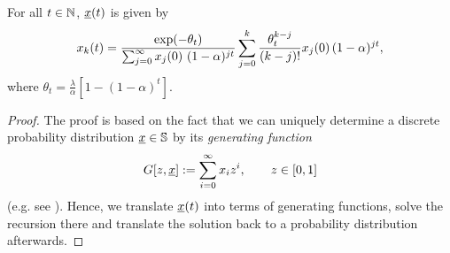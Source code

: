 \begin{Theorem} \label{ips:t:maia}
For all $t \in \mathbb{N}$,  $\underline{x} \! \left( t \right)$ is given by
\begin{equation} \label{ips_explicit}
x_{k} \! \left( t \right) = \frac{\exp(-\theta_t)}{\sum_{j=0}^\infty
x_{j} \! \left( 0 \right) \, (1-\alpha)^{j t}}
\sum_{j=0}^k \frac{\theta^{k-j}_t}{(k-j)!} x_{j} \! \left( 0 \right) (1-\alpha)^{j t},
\end{equation}
where $\theta_t = \frac{\lambda}{\alpha}\left[ 1 - \left(1-\alpha\right)^t \right] $.
\end{Theorem}
\begin{proof}
The proof is based on the fact that we can uniquely determine a discrete probability distribution
$\underline{x} \in \mathbb{S}$ by its \emph{generating function}
\[ G[z,\underline{x}] := \sum_{i=0}^\infty x_i z^i, \qquad z \in [0,1] \]
(e.g. see \citet[Chapter 3]{klenke_wahrscheinlichkeitstheorie_2006}). Hence, we translate
$\underline{x} \! \left( t \right)$ into terms of generating functions, solve the recursion there and translate the
solution back to a probability distribution afterwards.


\end{proof}
